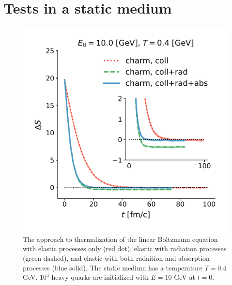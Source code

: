 \documentclass[aps, prc, reprint, amsmath, groupedaddress, nofootinbib]{revtex4-1}
\begin{document}
\section{Tests in a static medium}\label{section:test}
\begin{figure}
\includegraphics[width=\columnwidth]{thermalization.pdf}
\caption{The approach to thermalization of the linear Boltzmann equation with elastic processes only (red dot), elastic with radiation processes (green dashed), and elastic with both radaition and absorption processes (blue solid). The static medium has a temperature $T = 0.4$ GeV. $10^4$ heavy quarks are initialized with $E = 10$ GeV at $t = 0$.}\label{plots:thermalization}
\end{figure}
\end{document}
